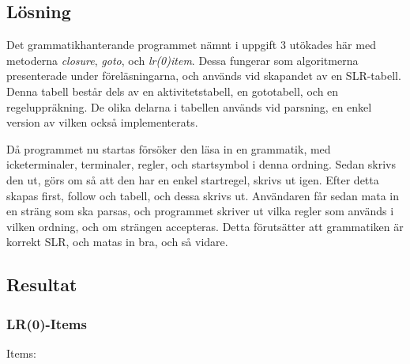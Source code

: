 \documentclass[10pt, titlepage, oneside, a4paper]{article}
\begin{document}
	\subsection{Lösning}
	
		Det grammatikhanterande programmet nämnt i uppgift 3 utökades här med metoderna \textit{closure}, \textit{goto}, och \textit{lr(0)item}. Dessa fungerar som algoritmerna presenterade under föreläsningarna, och används vid skapandet av en SLR-tabell. Denna  tabell består dels av en aktivitetstabell, en gototabell, och en regeluppräkning. De olika delarna i tabellen används vid parsning, en enkel version av vilken också implementerats.
		
		Då programmet nu startas försöker den läsa in en grammatik, med icketerminaler, terminaler, regler, och	startsymbol i denna ordning. Sedan skrivs den ut, görs om så att den har en enkel startregel, skrivs ut igen. Efter detta skapas first, follow och tabell, och dessa skrivs ut. Användaren får sedan mata in en sträng som ska parsas, och programmet skriver ut vilka regler som används i vilken ordning, och om strängen accepteras. Detta förutsätter att grammatiken är korrekt SLR, och matas in bra, och så vidare.
		
		
		\pagebreak
	\subsection{Resultat}
	
	\subsubsection{LR(0)-Items}


Items:\\
\end{document}

